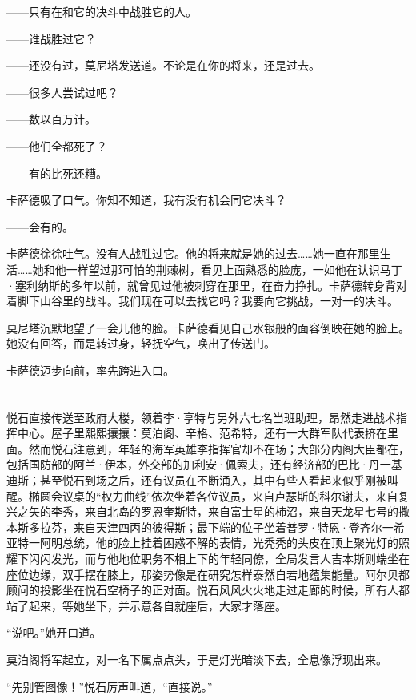 \documentclass[AutoFakeBold=true]{book}
\begin{document}
{\kaishu ——只有在和它的决斗中战胜它的人。}

{\kaishu ——谁战胜过它？}

{\kaishu ——还没有过，}莫尼塔发送道。{\kaishu 不论是在你的将来，还是过去。}

{\kaishu ——很多人尝试过吧？}

{\kaishu ——数以百万计。}

{\kaishu ——他们全都死了？}

{\kaishu ——有的比死还糟。}

卡萨德吸了口气。{\kaishu 你知不知道，我有没有机会同它决斗？}

{\kaishu ——会有的。}

卡萨德徐徐吐气。没有人战胜过它。他的将来就是她的过去……她一直在那里生活……她和他一样望过那可怕的荆棘树，看见上面熟悉的脸庞，一如他在认识马丁·塞利纳斯的多年以前，就曾见过他被刺穿在那里，在奋力挣扎。卡萨德转身背对着脚下山谷里的战斗。{\kaishu 我们现在可以去找它吗？我要向它挑战，一对一的决斗。}

莫尼塔沉默地望了一会儿他的脸。卡萨德看见自己水银般的面容倒映在她的脸上。她没有回答，而是转过身，轻抚空气，唤出了传送门。

卡萨德迈步向前，率先跨进入口。

\chapter{}

悦石直接传送至政府大楼，领着李·亨特与另外六七名当班助理，昂然走进战术指挥中心。屋子里熙熙攘攘：莫泊阁、辛格、范希特，还有一大群军队代表挤在里面。然而悦石注意到，年轻的海军英雄李指挥官却不在场；大部分内阁大臣都在，包括国防部的阿兰·伊本，外交部的加利安·佩索夫，还有经济部的巴比·丹一基迪斯；甚至悦石到场之后，还有议员在不断涌入，其中有些人看起来似乎刚被叫醒。椭圆会议桌的``权力曲线''依次坐着各位议员，来自卢瑟斯的科尔谢夫，来自复兴之矢的李秀，来自北岛的罗恩奎斯特，来自富士星的柿沼，来自天龙星七号的撒本斯多拉芬，来自天津四丙的彼得斯；最下端的位子坐着普罗·特恩·登齐尔一希亚特一阿明总统，他的脸上挂着困惑不解的表情，光秃秃的头皮在顶上聚光灯的照耀下闪闪发光，而与他地位职务不相上下的年轻同僚，全局发言人吉本斯则端坐在座位边缘，双手摆在膝上，那姿势像是在研究怎样泰然自若地蕴集能量。阿尔贝都顾问的投影坐在悦石空椅子的正对面。悦石风风火火地走过走廊的时候，所有人都站了起来，等她坐下，并示意各自就座后，大家才落座。

``说吧。''她开口道。

莫泊阁将军起立，对一名下属点点头，于是灯光暗淡下去，全息像浮现出来。

``先别管图像！''悦石厉声叫道，``直接{\kaishu 说}。''
\end{document}
